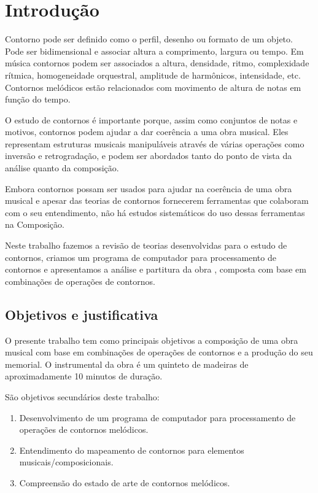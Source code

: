 \chapter{Introdução}
\label{cha:introducao}

Contorno pode ser definido como o perfil, desenho ou formato de um
objeto. Pode ser bidimensional e associar altura a comprimento,
largura ou tempo. Em música contornos podem ser associados a altura,
densidade, ritmo, complexidade rítmica, homogeneidade orquestral,
amplitude de harmônicos, intensidade, etc. Contornos melódicos estão
relacionados com movimento de altura de notas em função do tempo.

O estudo de contornos é importante porque, assim como conjuntos de
notas e motivos, contornos podem ajudar a dar coerência a uma obra
musical. Eles representam estruturas musicais manipuláveis através de
várias operações como inversão e retrogradação, e podem ser abordados
tanto do ponto de vista da análise quanto da composição.


Embora contornos possam ser usados para ajudar na coerência de uma
obra musical e apesar das teorias de contornos fornecerem ferramentas
que colaboram com o seu entendimento, não há estudos sistemáticos do
uso dessas ferramentas na Composição.

Neste trabalho fazemos a revisão de teorias desenvolvidas para o
estudo de contornos, criamos um programa de computador para
processamento de contornos e apresentamos a análise e partitura da
obra \obra{}, composta com base em combinações de operações de
contornos.

\section{Objetivos e justificativa}
\label{sec:objet-e-just}

O presente trabalho tem como principais objetivos a composição de uma
obra musical com base em combinações de operações de contornos e a
produção do seu memorial. O instrumental da obra é um quinteto de
madeiras de aproximadamente 10 minutos de duração.

São objetivos secundários deste trabalho:

\begin{enumerate}
\item Desenvolvimento de um programa de computador para processamento
  de operações de contornos melódicos.
\item Entendimento do mapeamento de contornos para elementos
  musicais/composicionais.
\item Compreensão do estado de arte de contornos melódicos.
\end{enumerate}

